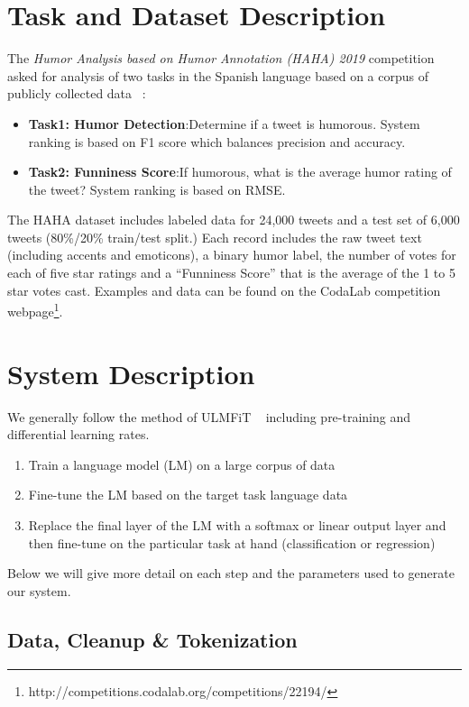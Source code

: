 \documentclass[smallextended]{svjour3}       %
\begin{document}
\section{Task and Dataset Description}
\label{sec:task}
The \textit{Humor Analysis based on Humor Annotation (HAHA) 2019}\cite{overview_haha2019} competition asked for analysis of two tasks in the Spanish language based on a corpus of publicly collected data ~\cite{castro2018crowd}:
\begin{itemize}
\item \textbf{Task1: Humor Detection}:Determine if a tweet is humorous. System ranking is based on F1 score which balances precision and accuracy.
\item \textbf{Task2: Funniness Score}:If humorous, what is the average humor rating of the tweet? System ranking is based on RMSE.
\end{itemize}
The HAHA dataset includes labeled data for 24,000 tweets and a test set of 6,000 tweets (80\%/20\% train/test split.)  Each record includes the raw tweet text (including accents and emoticons), a binary humor label, the number of votes for each of five star ratings and a ``Funniness Score'' that is the average of the 1 to 5 star votes cast.  Examples and data can be found on the CodaLab competition webpage\footnote{http://competitions.codalab.org/competitions/22194/}.

\section{System Description}
\label{sec:system}
We generally follow the method of ULMFiT ~\cite{HowardRuder:DBLP:journals/corr/abs-1801-06146} including pre-training and differential learning rates. 
\begin{enumerate}
	\item Train a language model (LM) on a large corpus of data
	\item Fine-tune the LM based on the target task language data
	\item Replace the final layer of the LM with a softmax or linear output layer and then fine-tune on the particular task at hand (classification or regression)
\end{enumerate}
Below we will give more detail on each step and the parameters used to generate our system.
\subsection{Data, Cleanup \& Tokenization}
\label{sec:datacleaning}
\end{document}
